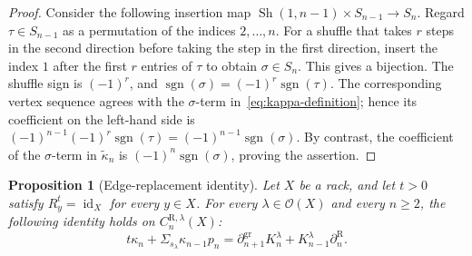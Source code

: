 \documentclass[11pt]{article}
\newtheorem{proposition}[theorem]{Proposition}
\DeclareMathOperator{\sgn}{sgn}
\newcommand{\OO}{\mathcal O}
\newcommand{\tkap}{\widetilde\kappa}
\newcommand{\gr}{\mathrm{gr}}
\newcommand{\R}{\mathrm R}
\begin{document}
\begin{proof}
Consider the following insertion map $\operatorname{Sh}(1,n-1)\times S_{n-1}\to S_n$. Regard $\tau\in S_{n-1}$ as a permutation of the indices $2,\ldots,n$. For a shuffle that takes $r$ steps in the second direction before taking the step in the first direction, insert the index $1$ after the first $r$ entries of $\tau$ to obtain $\sigma\in S_n$. This gives a bijection. The shuffle sign is $(-1)^r$, and $\sgn(\sigma)=(-1)^r\sgn(\tau)$. The corresponding vertex sequence agrees with the $\sigma$-term in~\eqref{eq:kappa-definition}; hence its coefficient on the left-hand side is
$(-1)^{n-1}(-1)^r\sgn(\tau)=(-1)^{n-1}\sgn(\sigma)$. By contrast, the coefficient of the $\sigma$-term in $\tkap_n$ is $(-1)^n\sgn(\sigma)$, proving the assertion.
\end{proof}

\begin{proposition}[Edge-replacement identity]
\label{prop:edge-replacement}
Let $X$ be a rack, and let $t>0$ satisfy $R_y^t=\operatorname{id}_X$ for every $y\in X$. For every $\lambda\in\OO(X)$ and every $n\ge2$, the following identity holds on $C_n^{\R,\lambda}(X)$:
\begin{equation}
        t\kappa_n+
        \Sigma_{s_\lambda}\kappa_{n-1}p_n
        =
        \partial_{n+1}^{\gr}K_n^\lambda
        +K_{n-1}^\lambda\partial_n^\R.
\label{eq:edge-replacement}
\end{equation}
\end{proposition}
\end{document}
